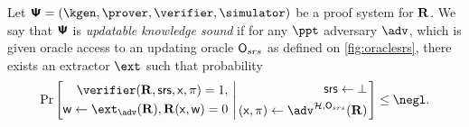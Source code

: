 \documentclass[runningheads,11pt]{llncs}
\begin{document}
\begin{definition}
  \label{def:us}
  Let $\ps = (\kgen, \prover, \verifier, \simulator)$ be a proof system for
  $\mathbf{R}$. We say that $\bm{\mathsf{\Psi}}$ is \emph{updatable knowledge sound} if for any
  $\ppt$ adversary $\adv$, which is given oracle access to an updating oracle
  $\mathsf{O}_{srs}$ as defined on \cref{fig:oraclesrs}, there exists an extractor
  $\ext$ such that probability
  \[
    \Pr \left[
        \begin{aligned}
          \verifier(\REL, \srs, \inp, \zkproof) = 1, \\
          \wit \gets \ext_\adv(\REL), \REL(\inp, \wit) = 0
        \end{aligned}
        \, \left| \,
          \begin{aligned}
            \srs \gets \bot \\
            (\inp, \zkproof) \gets \adv^{\ro, \oraclesrs}(\REL)
          \end{aligned}
        \right.  \right] \leq \negl.
    \]
\end{definition}
\end{document}
